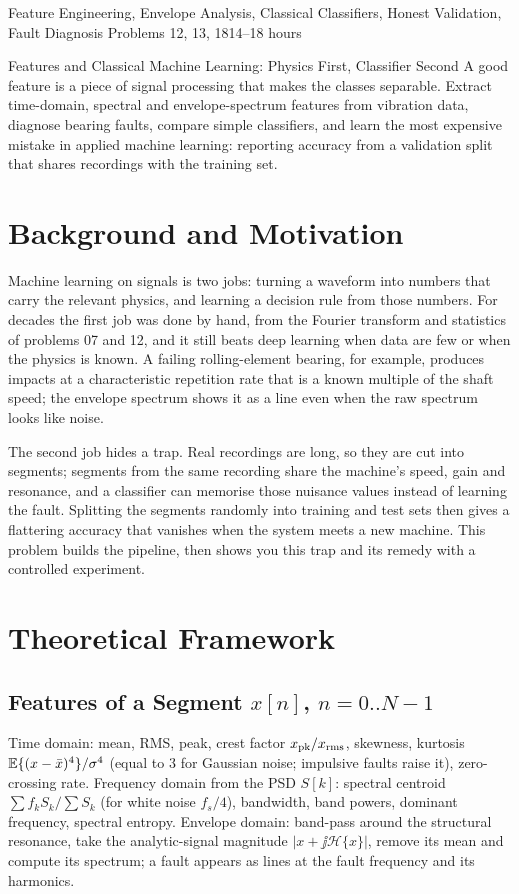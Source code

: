 \documentclass[11pt,a4paper]{article}
\begin{document}
%
{Feature Engineering, Envelope Analysis, Classical Classifiers, Honest Validation, Fault Diagnosis}%
{Problems 12, 13, 18}{14--18 hours}

\begin{summarybox}{Features and Classical Machine Learning: Physics First, Classifier Second}
A good feature is a piece of signal processing that makes the classes separable. Extract time-domain, spectral and envelope-spectrum features from vibration data, diagnose bearing faults, compare simple classifiers, and learn the most expensive mistake in applied machine learning: reporting accuracy from a validation split that shares recordings with the training set.
\end{summarybox}


\section*{Background and Motivation}
Machine learning on signals is two jobs: turning a waveform into numbers that carry the relevant physics, and learning a decision rule from those numbers. For decades the first job was done by hand, from the Fourier transform and statistics of problems 07 and 12, and it still beats deep learning when data are few or when the physics is known. A failing rolling-element bearing, for example, produces impacts at a characteristic repetition rate that is a known multiple of the shaft speed; the envelope spectrum shows it as a line even when the raw spectrum looks like noise.

The second job hides a trap. Real recordings are long, so they are cut into segments; segments from the same recording share the machine's speed, gain and resonance, and a classifier can memorise those nuisance values instead of learning the fault. Splitting the segments randomly into training and test sets then gives a flattering accuracy that vanishes when the system meets a new machine. This problem builds the pipeline, then shows you this trap and its remedy with a controlled experiment.

\section*{Theoretical Framework}
\subsection{Features of a Segment $x[n]$, $n=0..N-1$}
Time domain: mean, RMS, peak, crest factor $x_{\rm pk}/x_{\rm rms}$, skewness, kurtosis $\mathbb{E}\{(x-\bar x)^4\}/\sigma^4$ (equal to $3$ for Gaussian noise; impulsive faults raise it), zero-crossing rate. Frequency domain from the PSD $S[k]$: spectral centroid $\sum f_kS_k/\sum S_k$ (for white noise $f_s/4$), bandwidth, band powers, dominant frequency, spectral entropy. Envelope domain: band-pass around the structural resonance, take the analytic-signal magnitude $|x+\jj\mathcal H\{x\}|$, remove its mean and compute its spectrum; a fault appears as lines at the fault frequency and its harmonics.
\end{document}

